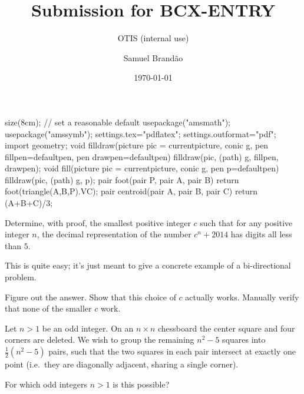 \usepackage{asymptote}
\begin{asydef}
size(8cm); // set a reasonable default
usepackage("amsmath");
usepackage("amssymb");
settings.tex="pdflatex";
settings.outformat="pdf";
import geometry;
void filldraw(picture pic = currentpicture, conic g, pen fillpen=defaultpen, pen drawpen=defaultpen) { filldraw(pic, (path) g, fillpen, drawpen); }
void fill(picture pic = currentpicture, conic g, pen p=defaultpen) { filldraw(pic, (path) g, p); }
pair foot(pair P, pair A, pair B) { return foot(triangle(A,B,P).VC); }
pair centroid(pair A, pair B, pair C) { return (A+B+C)/3; }
\end{asydef}

\newcommand{\goals}[2]{\bgroup
\sffamily\small \emph{Instructions}: Solve \clubg{#1}.
If you have time, solve \clubg{#2}.\egroup\par}

\title{Submission for BCX-ENTRY}
\subtitle{OTIS (internal use)}
\author{Samuel Brandão}
\date{\today}
\maketitle

\begin{example*}
	Determine, with proof, the smallest positive integer $c$
	such that for any positive integer $n$,
	the decimal representation of the number $c^n+2014$ has digits all less than $5$.
\end{example*} 

\begin{walkthrough}
	This is quite easy; it's just meant to give a concrete example
	of a bi-directional problem.
	\begin{walk}
		\ii Figure out the answer.
		\ii Show that this choice of $c$ actually works.
		\ii Manually verify that none of the smaller $c$ work.
	\end{walk}
\end{walkthrough}

\begin{example*}
	Let $n > 1$ be an odd integer.
	On an $n \times n$ chessboard the center square
	and four corners are deleted.  We wish to group
	the remaining $n^2-5$ squares into $\frac12(n^2-5)$ pairs,
	such that the two squares in each pair intersect at exactly one point
	(i.e.\ they are diagonally adjacent, sharing a single corner).

	For which odd integers $n > 1$ is this possible?
\end{example*} 

